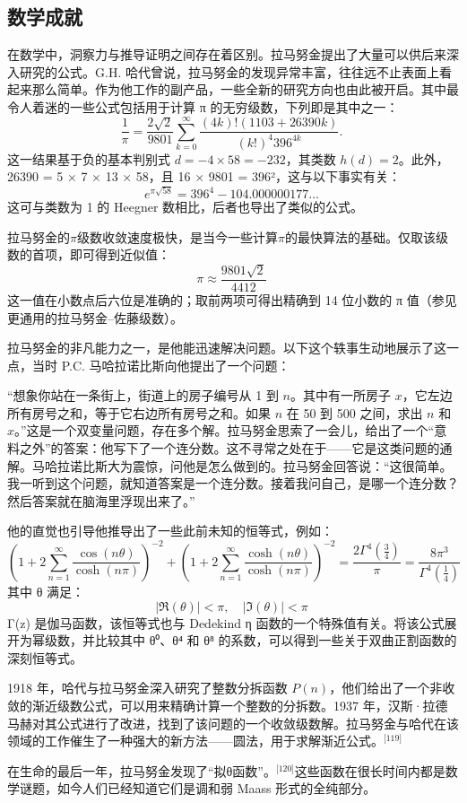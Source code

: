 \subsection{数学成就}
在数学中，洞察力与推导证明之间存在着区别。拉马努金提出了大量可以供后来深入研究的公式。G.H. 哈代曾说，拉马努金的发现异常丰富，往往远不止表面上看起来那么简单。作为他工作的副产品，一些全新的研究方向也由此被开启。其中最令人着迷的一些公式包括用于计算 π 的无穷级数，下列即是其中之一：
$$
\frac{1}{\pi} = \frac{2\sqrt{2}}{9801} \sum_{k=0}^{\infty} \frac{(4k)!(1103 + 26390k)}{(k!)^4 396^{4k}}.~
$$
这一结果基于负的基本判别式 $d = -4 \times 58 = -232$，其类数 $h(d) = 2$。此外，26390 = 5 × 7 × 13 × 58，且 16 × 9801 = 396²，这与以下事实有关：
$$
e^{\pi \sqrt{58}} = 396^4 - 104.000000177\ldots~
$$
这可与类数为 1 的 Heegner 数相比，后者也导出了类似的公式。

拉马努金的$\pi$级数收敛速度极快，是当今一些计算$\pi$的最快算法的基础。仅取该级数的首项，即可得到近似值：
$$
\pi \approx \frac{9801\sqrt{2}}{4412}~
$$
这一值在小数点后六位是准确的；取前两项可得出精确到 14 位小数的 π 值（参见更通用的拉马努金–佐藤级数）。

拉马努金的非凡能力之一，是他能迅速解决问题。以下这个轶事生动地展示了这一点，当时 P.C. 马哈拉诺比斯向他提出了一个问题：

“想象你站在一条街上，街道上的房子编号从 1 到 $n$。其中有一所房子 $x$，它左边所有房号之和，等于它右边所有房号之和。如果 $n$ 在 50 到 500 之间，求出 $n$ 和 $x$。”这是一个双变量问题，存在多个解。拉马努金思索了一会儿，给出了一个“意料之外”的答案：他写下了一个连分数。这不寻常之处在于——它是这类问题的通解。马哈拉诺比斯大为震惊，问他是怎么做到的。拉马努金回答说：“这很简单。我一听到这个问题，就知道答案是一个连分数。接着我问自己，是哪一个连分数？然后答案就在脑海里浮现出来了。”

他的直觉也引导他推导出了一些此前未知的恒等式，例如：
$$
\left(1+2\sum_{n=1}^{\infty} \frac{\cos(n\theta)}{\cosh(n\pi)}\right)^{-2}
+
\left(1+2\sum_{n=1}^{\infty} \frac{\cosh(n\theta)}{\cosh(n\pi)}\right)^{-2}
=
\frac{2\Gamma^4\left(\frac{3}{4}\right)}{\pi}
=
\frac{8\pi^3}{\Gamma^4\left(\frac{1}{4}\right)}~
$$
其中 θ 满足：
$$
|\Re(\theta)| < \pi,\quad |\Im(\theta)| < \pi~
$$
Γ(z) 是伽马函数，该恒等式也与 Dedekind η 函数的一个特殊值有关。将该公式展开为幂级数，并比较其中 θ⁰、θ⁴ 和 θ⁸ 的系数，可以得到一些关于双曲正割函数的深刻恒等式。

1918 年，哈代与拉马努金深入研究了整数分拆函数 $P(n)$，他们给出了一个非收敛的渐近级数公式，可以用来精确计算一个整数的分拆数。1937 年，汉斯·拉德马赫对其公式进行了改进，找到了该问题的一个收敛级数解。拉马努金与哈代在该领域的工作催生了一种强大的新方法——圆法，用于求解渐近公式。\(^\text{[119]}\)

在生命的最后一年，拉马努金发现了“拟θ函数”。\(^\text{[120]}\)这些函数在很长时间内都是数学谜题，如今人们已经知道它们是调和弱 Maass 形式的全纯部分。
